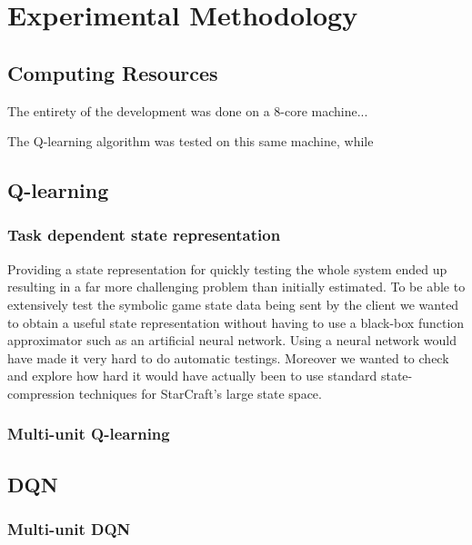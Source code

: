 \chapter{Experimental Methodology} 

\section{Computing Resources}

The entirety of the development was done on a 8-core machine...

The Q-learning algorithm was tested on this same machine, while 

\section{Q-learning}

\subsection{Task dependent state representation}

Providing a state representation for quickly testing the whole system ended up
resulting in a far more challenging problem than initially estimated. To be able
to extensively test the symbolic game state data being sent by the client we
wanted to obtain a useful state representation without having to use a black-box
function approximator such as an artificial neural network. Using a neural
network would have made it very hard to do automatic testings. Moreover we
wanted to check and explore how hard it would have actually been to use standard
state-compression techniques for StarCraft's large state space.

\subsection{Multi-unit Q-learning}

\section{DQN}

\subsection{Multi-unit DQN}